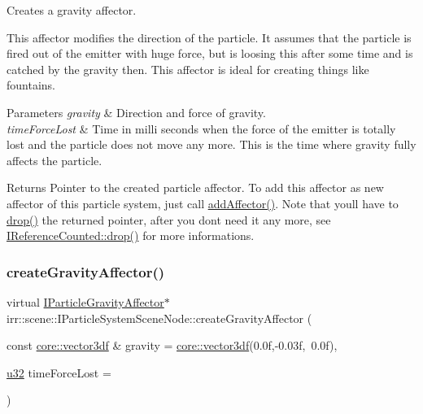 Creates a gravity affector. 

This affector modifies the direction of the particle. It assumes that the particle is fired out of the emitter with huge force, but is loosing this after some time and is catched by the gravity then. This affector is ideal for creating things like fountains. 
\begin{DoxyParams}{Parameters}
{\em gravity} & Direction and force of gravity. \\
\hline
{\em time\+Force\+Lost} & Time in milli seconds when the force of the emitter is totally lost and the particle does not move any more. This is the time where gravity fully affects the particle. \\
\hline
\end{DoxyParams}
\begin{DoxyReturn}{Returns}
Pointer to the created particle affector. To add this affector as new affector of this particle system, just call \hyperlink{classirr_1_1scene_1_1IParticleSystemSceneNode_a401f5afbbb748878011c5ceb7d447f8b}{add\+Affector()}. Note that you\textquotesingle{}ll have to \hyperlink{classirr_1_1IReferenceCounted_a03856a09355b89d178090c4a5f738543}{drop()} the returned pointer, after you don\textquotesingle{}t need it any more, see \hyperlink{classirr_1_1IReferenceCounted_a03856a09355b89d178090c4a5f738543}{I\+Reference\+Counted\+::drop()} for more informations. 
\end{DoxyReturn}
\mbox{\label{classirr_1_1scene_1_1IParticleSystemSceneNode_af06d3565f9c352bdcdf68bb2e3797c32}} 
\subsubsection{\texorpdfstring{create\+Gravity\+Affector()}{createGravityAffector()}\hspace{0.1cm}{\footnotesize\ttfamily [2/2]}}
{\footnotesize\ttfamily virtual \hyperlink{classirr_1_1scene_1_1IParticleGravityAffector}{I\+Particle\+Gravity\+Affector}$\ast$ irr\+::scene\+::\+I\+Particle\+System\+Scene\+Node\+::create\+Gravity\+Affector (\begin{DoxyParamCaption}\item[{const \hyperlink{namespaceirr_1_1core_ae6e2b2a6c552833ebbd5b7463d03586b}{core\+::vector3df} \&}]{gravity = {\ttfamily \hyperlink{namespaceirr_1_1core_ae6e2b2a6c552833ebbd5b7463d03586b}{core\+::vector3df}(0.0f,-\/0.03f,~0.0f)},  }\item[{\hyperlink{namespaceirr_a0416a53257075833e7002efd0a18e804}{u32}}]{time\+Force\+Lost = {} }\end{DoxyParamCaption})\hspace{0.3cm}{\ttfamily [pure virtual]}}



